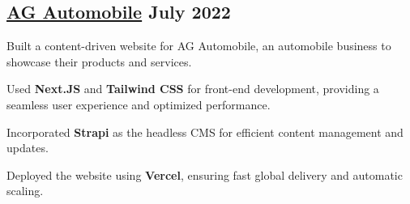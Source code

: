 \subsection{{\href{https://www.agautomobile.com/}{AG Automobile} \hfill July 2022}}
\begin{zitemize}
\item Built a content-driven website for AG Automobile, an automobile business to showcase their products and services.
\item Used \textbf{Next.JS} and \textbf{Tailwind CSS} for front-end development, providing a seamless user experience and optimized performance.
\item Incorporated \textbf{Strapi} as the headless CMS for efficient content management and updates.
\item Deployed the website using \textbf{Vercel}, ensuring fast global delivery and automatic scaling.
\end{zitemize}


